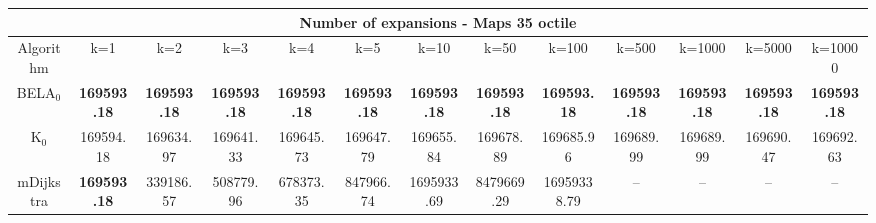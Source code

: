 \begin{tabular}{c|cccccccccccc}\toprule
\multicolumn{13}{c}{Number of expansions - Maps 35 octile}\\ \midrule
Algorithm & k=1 & k=2 & k=3 & k=4 & k=5 & k=10 & k=50 & k=100 & k=500 & k=1000 & k=5000 & k=10000 \\ \midrule
BELA$_0$ & \textbf{169593.18} & \textbf{169593.18} & \textbf{169593.18} & \textbf{169593.18} & \textbf{169593.18} & \textbf{169593.18} & \textbf{169593.18} & \textbf{169593.18} & \textbf{169593.18} & \textbf{169593.18} & \textbf{169593.18} & \textbf{169593.18} \\
K$_0$ & 169594.18 & 169634.97 & 169641.33 & 169645.73 & 169647.79 & 169655.84 & 169678.89 & 169685.96 & 169689.99 & 169689.99 & 169690.47 & 169692.63 \\
mDijkstra & \textbf{169593.18} & 339186.57 & 508779.96 & 678373.35 & 847966.74 & 1695933.69 & 8479669.29 & 16959338.79 & -- & -- & -- & -- \\ \bottomrule 
\end{tabular}

